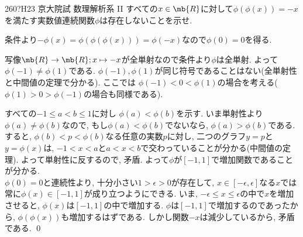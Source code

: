 \begin{thm}{260}{\hosi ?}{H23 京大院試 数理解析系 II}
すべての$x\in \mb{R}$に対して$\phi(\phi(x)) = -x$を満たす実数値連続関数$\phi$は存在しないことを示せ. 
\end{thm}

条件より$-\phi(x) = \phi(\phi(\phi(x))) = \phi(-x)$なので$\phi(0) = 0$を得る. \par 
写像$\mb{R}\to \mb{R}; x\mapsto -x$が全単射なので条件より$\phi$は全単射. よって$\phi(-1) \neq \phi(1)$である. $\phi(-1),\phi(1)$が同じ符号であることはない(全単射性と中間値の定理で分かる). ここでは $\phi(-1)<0<\phi(1)$の場合を考える($\phi(1)>0>\phi(-1)$の場合も同様である). \par
{}
すべての$-1\leq a<b\leq 1$に対し $\phi(a)<\phi(b)$を示す. いま単射性より$\phi(a)\neq \phi(b)$なので, もし$\phi(a) < \phi(b)$でないなら, $\phi(a) > \phi(b)$である. すると, $\phi(b) < p < \phi(b)$なる任意の実数$p$に対し, 二つのグラフ$y=p$と$y=\phi(x)$は, $-1< x<a$と$a<x<b$で交わっていることが分かる(中間値の定理). よって単射性に反するので, 矛盾. よって$\phi$が$[-1,1]$で増加関数であることが分かる. \\
$\phi(0) = 0$と連続性より, 十分小さい$1>\epsilon > 0$が存在して, $x\in [-\epsilon,\epsilon]$なる$x$では常に$\phi(x)\in [-1,1]$が成り立つようにできる. いま, $-\epsilon \leq x\leq \epsilon$の中で$x$を増加させると, $\phi(x)$は$[-1,1]$の中で増加する. $\phi$は$[-1,1]$で増加するのであったから, $\phi(\phi(x))$も増加するはずである. しかし関数$-x$は減少しているから, 矛盾である. \qed 